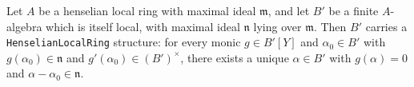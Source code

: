 \begin{lemma}
\label{lem:henselianPair-l3c-finite-over-henselian-is-henselian}
Let $A$ be a henselian local ring with maximal ideal $\mathfrak
m$, and let $B'$ be a finite $A$-algebra which is itself local,
with maximal ideal $\mathfrak n$ lying over $\mathfrak m$. Then
$B'$ carries a \texttt{HenselianLocalRing} structure: for every
monic $g \in B'[Y]$ and $\alpha_0 \in B'$ with $g(\alpha_0) \in
\mathfrak n$ and $g'(\alpha_0) \in (B')^\times$, there exists a
unique $\alpha \in B'$ with $g(\alpha) = 0$ and $\alpha -
\alpha_0 \in \mathfrak n$.
\end{lemma}

